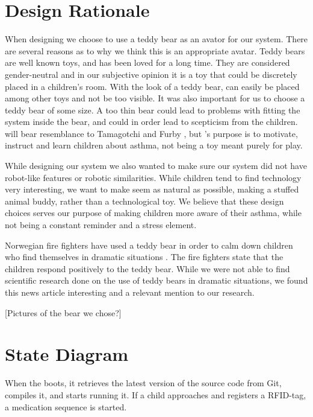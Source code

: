 \section{Design Rationale}
When designing \buddy{} we choose to use a teddy bear as an avator for our system. There are several reasons as to why we think this is an appropriate avatar. Teddy bears are well known toys, and has been loved for a long time. They are considered gender-neutral \cite{stagnitti1997determining} \cite{cherney2006gender} and in our subjective opinion it is a toy that could be discretely placed in a children's room. With the look of a teddy bear, \buddy{} can easily be placed among other toys and not be too visible. It was also important for us to choose a teddy bear of some size. A too thin bear could lead to problems with fitting the system inside the bear, and could in order lead to scepticism from the children. \buddy{} will bear resemblance to Tamagotchi \cite{tamagotchi} and Furby \cite{furby}, but \buddy{}'s purpose is to motivate, instruct and learn children about asthma, not being a toy meant purely for play. 

While designing our system we also wanted to make sure our system did not have robot-like features or robotic similarities. While children tend to find technology very interesting, we want to make \buddy{} seem as natural as possible, making a stuffed animal buddy, rather than a technological toy. We believe that these design choices serves our purpose of making children more aware of their asthma, while not being a constant reminder and a stress element.

Norwegian fire fighters have used a teddy bear in order to calm down children who find themselves in dramatic situations . The fire fighters state that the children respond positively to the teddy bear. 
While we were not able to find scientific research done on the use of teddy bears in dramatic situations, we found this news article interesting and a relevant mention to our research.

[Pictures of the bear we chose?]


\section{State Diagram}
When the \rpi{} boots, it retrieves the latest version of the source code from Git, compiles it, and starts running it. If a child approaches \buddy{} and registers a RFID-tag, a medication sequence is started.  

